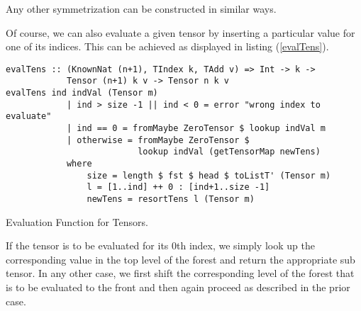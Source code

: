 Any other symmetrization can be constructed in similar ways.

Of course, we can also evaluate a given tensor by inserting a particular value for one of its indices. This can be achieved as displayed in listing (\ref{evalTens}).
\begin{listing}[hbt!] 
\begin{verbatim}
evalTens :: (KnownNat (n+1), TIndex k, TAdd v) => Int -> k ->
            Tensor (n+1) k v -> Tensor n k v
evalTens ind indVal (Tensor m)
            | ind > size -1 || ind < 0 = error "wrong index to evaluate"
            | ind == 0 = fromMaybe ZeroTensor $ lookup indVal m
            | otherwise = fromMaybe ZeroTensor $
                          lookup indVal (getTensorMap newTens)
            where
                size = length $ fst $ head $ toListT' (Tensor m)
                l = [1..ind] ++ 0 : [ind+1..size -1]
                newTens = resortTens l (Tensor m)
\end{verbatim}
\caption{Evaluation Function for Tensors.}\label{evalTens}
\end{listing}
If the tensor is to be evaluated for its $0$th index, we simply look up the corresponding value in the top level of the forest and return the appropriate sub tensor. In any other case, we first shift the corresponding level of the forest that is to be evaluated to the front and then again proceed as described in the prior case. 

